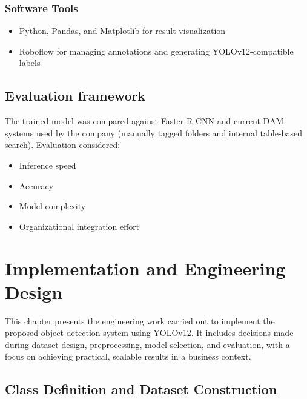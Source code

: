 \documentclass[a4paper,10pt,twocolumn]{article}
\numberwithin{figure}{section}
\numberwithin{table}{section}
\begin{document}
\subsubsection{Software Tools}

\begin{itemize} 
    \item Python, Pandas, and Matplotlib for result visualization
    \item Roboflow for managing annotations and generating YOLOv12-compatible labels
\end{itemize} 


\subsection{Evaluation framework}
The trained model was compared against 
Faster R-CNN and current DAM systems used 
by the company (manually tagged folders and 
internal table-based search). Evaluation considered:

\begin{itemize} 
    \item Inference speed
    \item Accuracy
    \item Model complexity
    \item Organizational integration effort
\end{itemize} 



\section{ Implementation and Engineering Design}

This chapter presents the engineering work carried out to 
implement the proposed object detection system using YOLOv12. 
It includes decisions made during dataset design, preprocessing, 
model selection, and evaluation, with a focus on achieving practical, 
scalable results in a business context.

\subsection{Class Definition and Dataset Construction}
\end{document}
